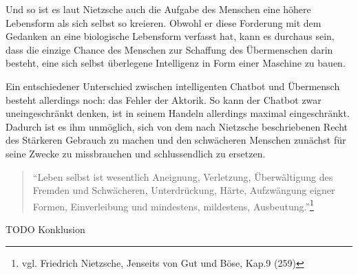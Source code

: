 Und so ist es laut Nietzsche auch die Aufgabe des Menschen eine höhere Lebensform als sich selbst so kreieren.
Obwohl er diese Forderung mit dem Gedanken an eine biologische Lebensform verfasst hat, kann es durchaus sein, dass die einzige Chance des Menschen zur Schaffung des Übermenschen darin besteht, eine sich selbst überlegene Intelligenz in Form einer Maschine zu bauen.

Ein entschiedener Unterschied zwischen intelligenten Chatbot und Übermensch besteht allerdings noch: das Fehler der Aktorik.
So kann der Chatbot zwar uneingeschränkt denken, ist in seinem Handeln allerdings maximal eingeschränkt.
Dadurch ist es ihm unmöglich, sich von dem nach Nietzsche beschriebenen Recht des Stärkeren Gebrauch zu machen und den schwächeren Menschen zunächst für seine Zwecke zu missbrauchen und schlussendlich zu ersetzen.
\begin{quote}
\enquote{Leben selbst ist wesentlich Aneignung, Verletzung, Überwältigung des Fremden und Schwächeren, Unterdrückung, Härte, Aufzwängung eigner Formen, Einverleibung und mindestens, mildestens, Ausbeutung.}\footnote{vgl. Friedrich Nietzsche, Jenseits von Gut und Böse, Kap.9 (259)}
\end{quote}

TODO Konklusion





